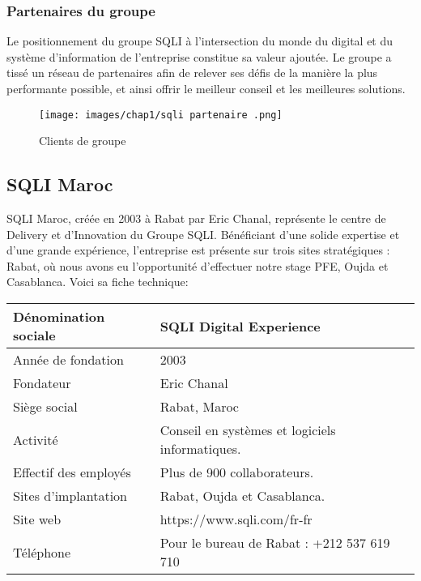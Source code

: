 \subsubsection{Partenaires du groupe}


\indent Le positionnement du groupe SQLI à l'intersection du monde du digital et du système d’information de l’entreprise constitue sa valeur ajoutée. Le groupe a tissé un réseau de partenaires afin de relever ses défis de la manière la plus performante possible, et ainsi offrir le meilleur conseil et les meilleures solutions.
\begin{figure}[H]  
  \centering  
  \texttt{[image: images/chap1/sqli partenaire .png]}
  \caption{Clients de groupe \cite{1}}
  \label{Logo SQLI}
\end{figure}


\subsection{SQLI Maroc}
\indent  SQLI Maroc, créée en 2003 à Rabat par Eric Chanal, représente le centre de Delivery et d'Innovation du Groupe SQLI. Bénéficiant d'une solide expertise et d'une grande expérience, l'entreprise est présente sur trois sites stratégiques : Rabat, où nous avons eu l'opportunité d'effectuer notre stage PFE, Oujda et Casablanca.   Voici sa fiche technique:



\captionsetup{type=table}
\vspace{0.3cm}
\begin{center}
\begin{tabularx}{17cm}{|X|X|}

  \hline
  
 \textbf{Dénomination sociale}  & \textbf{SQLI Digital Experience} \\
  \hline{Année de fondation} & 2003  \\
  \hline
  {Fondateur}& Eric Chanal  \\

  \hline
{Siège social} & Rabat, Maroc\\
 \hline  
 {Activité} & Conseil en systèmes et logiciels informatiques.\\
  
  \hline  
{Effectif des employés} & Plus de 900 collaborateurs.\\
  \hline
 {Sites d'implantation} & Rabat, Oujda et Casablanca.\\
 
  \hline
 {Site web} & https://www.sqli.com/fr-fr\\
  \hline
   {Téléphone} & Pour le bureau de Rabat : +212 537
619 710 \\
  \hline
  \end{tabularx}
  \end{center}

